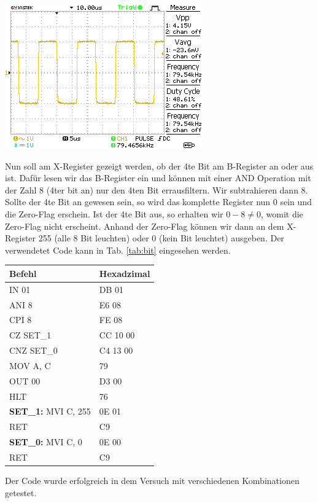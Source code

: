 \documentclass[10pt]{article}
\newenvironment{Figure}
  {\par\medskip\noindent\minipage{\linewidth}}
  {\endminipage\par\medskip}
\begin{document}
\begin{multicols}{2}
\begin{Figure}
  \centering\includegraphics{../data/DS0013.png}
  \label{fig:rs}
\end{Figure}

Nun soll am X-Register gezeigt werden, ob der 4te Bit am B-Register an oder aus ist. Dafür lesen wir das B-Register ein und können mit einer AND Operation mit der Zahl 8 (4ter bit an) nur den 4ten Bit errausfiltern. Wir subtrahieren dann 8. Sollte der 4te Bit an gewesen sein, so wird das komplette Register nun 0 sein und die Zero-Flag erschein. Ist der 4te Bit aus, so erhalten wir $0-8\neq0$, womit die Zero-Flag nicht erscheint. Anhand der Zero-Flag können wir dann an dem X-Register 255 (alle 8 Bit leuchten) oder 0 (kein Bit leuchtet) ausgeben. Der verwendetet Code kann in Tab. \ref{tab:bit} eingesehen werden.

	\begin{center}
		\begin{tabular}{|l|l|}
			\hline
			\textbf{Befehl}             & \textbf{Hexadzimal} \\
			\hline
			IN 01                       & DB 01               \\
			ANI 8                       & E6 08               \\
			CPI 8                       & FE 08               \\
			CZ SET\_1                   & CC 10 00            \\
			CNZ SET\_0                  & C4 13 00            \\
			MOV A, C                    & 79                  \\
			OUT 00                      & D3 00               \\
			HLT                         & 76                  \\
			\textbf{SET\_1:} MVI C, 255 & 0E 01               \\
			RET                         & C9                  \\
			\textbf{SET\_0:} MVI C, 0   & 0E 00               \\
			RET                         & C9                  \\
			\hline
		\end{tabular}
    \label{tab:bit}
	\end{center}
  Der Code wurde erfolgreich in dem Versuch mit verschiedenen Kombinationen getestet.


\end{multicols}
\end{document}
